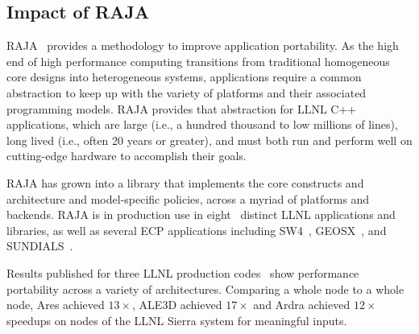

\subsection{Impact of RAJA}

RAJA~\cite{RAJA} provides a methodology to improve application portability.
As the high end of high performance computing transitions from traditional
homogeneous core designs into heterogeneous systems, applications 
require a common abstraction to keep up with the variety of platforms
and their associated programming models.
RAJA provides that abstraction for LLNL C++ applications, which are large
(i.e., a hundred thousand to low millions of lines), long lived (i.e., often
20 years or greater), and must both run and perform well on cutting-edge
hardware to accomplish their goals.

RAJA has grown into a library that implements the core constructs and
architecture and model-specific policies, across a myriad of platforms and
backends. RAJA is in production use in eight~\cite{raja-ecp-report} distinct
LLNL applications and libraries, as well as several ECP applications including
SW4~\cite{sw4}, GEOSX~\cite{geosx}, and SUNDIALS~\cite{sundials}.

Results published for three LLNL production codes~\cite{raja-p3hpc} show
performance portability across a variety of architectures.  Comparing a whole
node to a whole node, Ares achieved $13\times$, ALE3D achieved $17\times$ and
Ardra achieved $12\times$ speedups on nodes of the LLNL Sierra system for
meaningful inputs.

